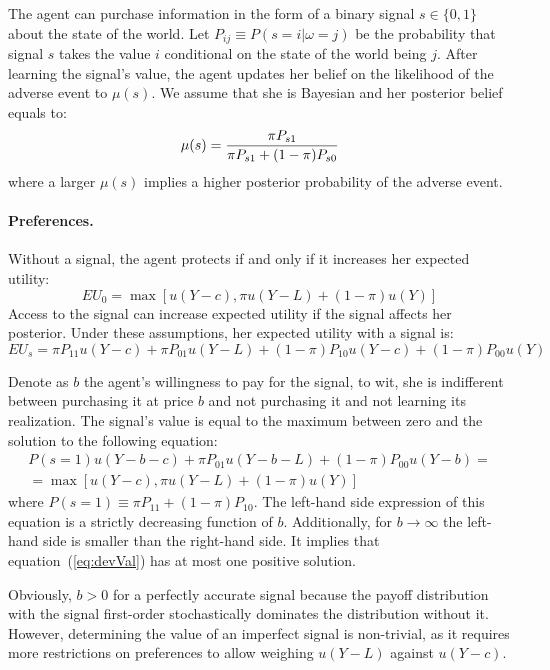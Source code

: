 \documentclass[12pt,a4paper]{article}
\begin{document}
The agent can purchase information in the form of a binary signal $s\in\{0,1\}$ about the state of the world. Let $P_{ij}\equiv P(s=i|\omega=j)$ be the probability that signal $s$ takes the value $i$ conditional on the state of the world being $j$.  After learning the signal's value, the agent updates her belief on the likelihood of the adverse event to $\mu(s)$. We assume that she is Bayesian and her posterior belief equals to:
\[
\mu(s)= {\pi P_{s1} \over \pi P_{s1}+(1-\pi)P_{s0}}
\]
where a larger $\mu(s)$ implies a higher posterior probability of the adverse event.

\vspace{10pt}
\paragraph{Preferences.} Without a signal, the agent protects if and only if it increases her expected utility:
\[
EU_0=\max[u(Y-c),\pi u(Y-L)+(1-\pi) u(Y)]
\]
Access to the signal can increase expected utility if the signal affects her posterior. Under these assumptions, her expected utility with a signal is:
\[
EU_s=\pi P_{11}u(Y-c)+\pi P_{01}u(Y-L)+(1-\pi)P_{10}u(Y-c)+(1-\pi)P_{00}u(Y)
\]

Denote as $b$ the agent's willingness to pay for the signal, to wit, she is indifferent between purchasing it at price $b$ and not purchasing it and not learning its realization. The signal's value is equal to the maximum between zero and the solution to the following equation:
\begin{equation}\label{eq:devVal}
\begin{split}
P(s=1)u(Y-b-c)+\pi P_{01}u(Y-b-L)+(1-\pi)P_{00}u(Y-b)=\\=\max[u(Y-c),\pi u(Y-L)+(1-\pi) u(Y)] 
\end{split}
\end{equation}
where $P(s=1)\equiv \pi P_{11}+(1-\pi)P_{10}$. The left-hand side expression of this equation is a strictly decreasing function of $b$. Additionally, for $b\rightarrow \infty$ the left-hand side is smaller than the right-hand side. It implies that equation~(\ref{eq:devVal}) has at most one positive solution.

Obviously, $b>0$ for a perfectly accurate signal because the payoff distribution with the signal first-order stochastically dominates the distribution without it. 
However, determining the value of an imperfect signal is non-trivial, as it requires more restrictions on preferences to allow weighing $u(Y-L)$ against $u(Y-c)$.
\end{document}
